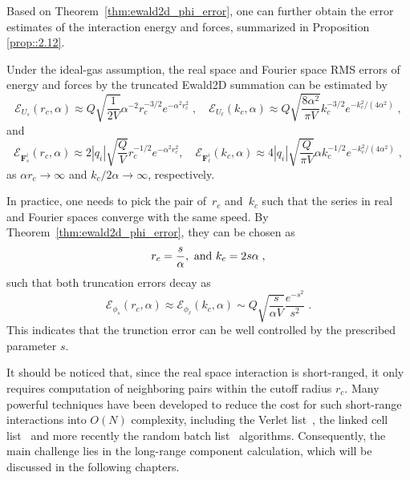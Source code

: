 Based on Theorem~\ref{thm:ewald2d_phi_error}, one can further obtain the error estimates of the interaction energy and forces, summarized in Proposition \ref{prop::2.12}.

\begin{prop}\label{prop::2.12}
	Under the ideal-gas assumption, the real space and Fourier space RMS errors of energy and forces by the truncated Ewald2D summation can be estimated by
	\begin{equation}\label{thm:ewald2d_error}
		\mathscr{E}_{U_s} (r_c, \alpha) \approx Q \sqrt{\frac{1}{2 V}} \alpha^{-2} r_c^{-3/2} e^{-\alpha^2r_c^2}\;,\quad
		\mathscr{E}_{U_{\ell}} (k_c, \alpha) \approx Q \sqrt{\frac{8 \alpha^2}{\pi V}} k_c^{-3/2} e^{- k_c^2/(4 \alpha^2)}\;,
	\end{equation}
	and
	\begin{equation}
		\mathscr{E}_{\bm{F}_{s}^i} (r_c, \alpha)\approx 2|q_{i}|\sqrt{\frac{Q}{V}}r_c^{-1/2}e^{-\alpha^2 r_c^2},\quad \mathscr{E}_{\bm{F}_{\ell}^i} (k_c, \alpha)\approx 4|q_{i}|\sqrt{\frac{Q}{\pi V}}\alpha k_c^{-1/2}e^{-k_c^2/(4\alpha^2)}\;,
	\end{equation}
	as $\alpha r_c\rightarrow\infty$ and $k_c/2\alpha\rightarrow\infty$, respectively.
\end{prop}

\begin{rmk}
	In practice, one needs to pick the pair of~$r_c$ and~$k_c$
	such that the series in real and Fourier spaces converge with the same speed.
	By Theorem~\ref{thm:ewald2d_phi_error}, they can be chosen as
	\begin{equation}\label{eq::rckc}
		r_c = \frac{s}{\alpha},~\hbox{and}~k_c = 2 s \alpha\;,
	\end{equation}
	such that both truncation errors decay as 
	\begin{equation}\label{eq:trunction_error}
		\mathscr{E}_{\phi_s}(r_c, \alpha)\approx \mathscr{E}_{\phi_\ell}(k_c, \alpha) \sim Q 
		\sqrt{\frac{s}{\alpha V}} \frac{e^{-s^2}}{s^2}\;.
	\end{equation}
	This indicates that the trunction error can be well controlled by the prescribed parameter $s$. 
\end{rmk}

It should be noticed that, since the real space interaction is short-ranged, it only requires computation of neighboring pairs within the cutoff radius $r_c$. 
Many powerful techniques have been developed to reduce the cost for such short-range interactions into $O(N)$ complexity, including the Verlet list~\cite{verlet1967computer}, the linked cell list~\cite{allen2017computer} and more recently the random batch list~\cite{liang2021random} algorithms. 
Consequently, the main challenge lies in the long-range component calculation, which will be discussed in the following chapters.

